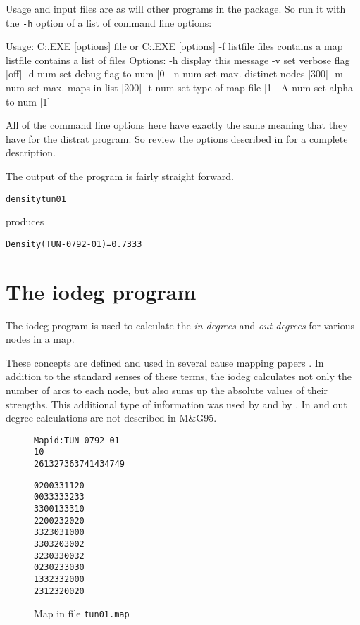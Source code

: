 \documentclass[%
	11pt,
        a4paper,
        twoside]{workrep}
\newcommand*{\prg}[1]{\textsf{#1}}		%
\newcommand*{\file}[1]{\texttt{#1}}		%
\newcommand*{\nt}[1]{\textit{#1}}		%
\newcommand*{\opt}[1]{\texttt{#1}}		%
\newcommand{\MG}{M\&G95\xspace}			%
\begin{document}
Usage and input files are as will other programs in the
package.  So run it with the \opt{-h} option of a list of
command line options:

\begin{verbatimtab}
Usage: C:\BIN\DENSITY.EXE [options] file
   or  C:\BIN\DENSITY.EXE [options] -f listfile
	files contains a map
	listfile contains a list of files
	Options:
		-h	display this message
		-v	set verbose flag [off]
		-d num	set debug flag to num [0]
		-n num	set max. distinct nodes [300]
		-m num	set max. maps in list [200]
		-t num	set type of map file [1]
		-A num	set alpha to num [1]
\end{verbatimtab}

All of the command line options here have exactly the same meaning
that they have for the \prg{distrat} program.
So review the options described in  for
a complete description.

The output of the program is fairly straight forward.
\begin{alltt}
  density tun01
\end{alltt}
produces
\begin{alltt}
Density(TUN-0792-01) = 0.7333
\end{alltt}


\chapter{The \prg{iodeg} program}\label{ch:iodeg}

The \prg{iodeg} program is used to calculate the \nt{in degrees} and
\nt{out degrees} for various nodes in a map.

These concepts are defined and used in several cause mapping papers
.  In
addition to the standard senses of these terms, the \prg{iodeg}
calculates not only the number of arcs to each node, but also
sums up the absolute values of their strengths.   This additional
type of information was used by  and
by .  In and out degree calculations
are not described in \MG.

\begin{figure}
\caption{Map in file \file{tun01.map}}\label{fig:tun01map}
\begin{alltt}
Map id: TUN-0792-01
10
 2  6 13 27 36 37 41 43 47 49

 0  2  0  0  3  3  1  1  2  0
 0  0  3  3  3  3  3  2  3  3
 3  3  0  0  1  3  3  3  1  0
 2  2  0  0  2  3  2  0  2  0
 3  3  2  3  0  3  1  0  0  0
 3  3  0  3  2  0  3  0  0  2
 3  2  3  0  3  3  0  0  3  2
 0  2  3  0  2  3  3  0  3  0
 1  3  3  2  3  3  2  0  0  0
 2  3  1  2  3  2  0  0  2  0
\end{alltt}
\end{figure}
\end{document}
